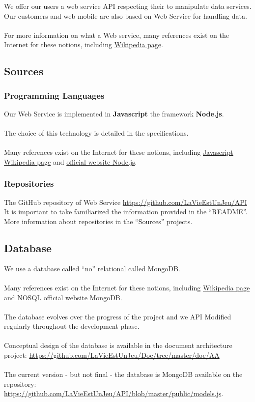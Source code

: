 \documentclass{life-fr}
\begin{document}
We offer our users a web service API respecting their
to manipulate data services. Our customers and web
mobile are also based on Web Service for handling
data.\\
\\
For more information on what a Web service, many
references exist on the Internet for these notions, including
\href{http://fr.wikipedia.org/wiki/Service_Web}{Wikipedia page}.

\subsection{Sources}

\subsubsection{Programming Languages}

Our Web Service is implemented in \textbf{Javascript}
the framework \textbf{Node.js}.\\
\\
The choice of this technology is detailed in the specifications.\\
\\
Many references exist on the Internet for these notions, including
\href{http://fr.wikipedia.org/wiki/JavaScript}{Javascript Wikipedia page}
and \href{http://nodejs.org/}{official website Node.js}.

\subsubsection{Repositories}

The GitHub repository of Web Service \url{https://github.com/LaVieEstUnJeu/API} \\
It is important to take familiarized the information provided in the
``README''.\\
More information about repositories in the ``Sources'' projects.

\subsection{Database}

We use a database called ``no'' relational called MongoDB. \\
\\
Many references exist on the Internet for these notions, including
\href{http://fr.wikipedia.org/wiki/NoSQL}{Wikipedia page and NOSQL}
\href{http://www.mongodb.org/}{official website MongoDB}.\\
\\
The database evolves over the progress of the project and we
API Modified regularly throughout the development phase.\\
\\
Conceptual design of the database is available in the document
architecture project: \url{https://github.com/LaVieEstUnJeu/Doc/tree/master/doc/AA} \\
\\
The current version - but not final - the database is MongoDB
available on the repository:
\url{https://github.com/LaVieEstUnJeu/API/blob/master/public/models.js}.
\end{document}
